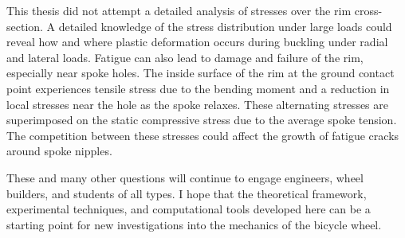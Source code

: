 \documentclass[\rootdir/thesis.tex]{subfiles}
\begin{document}
This thesis did not attempt a detailed analysis of stresses over the rim cross-section. A detailed knowledge of the stress distribution under large loads could reveal how and where plastic deformation occurs during buckling under radial and lateral loads. Fatigue can also lead to damage and failure of the rim, especially near spoke holes. The inside surface of the rim at the ground contact point experiences tensile stress due to the bending moment and a reduction in local stresses near the hole as the spoke relaxes. These alternating stresses are superimposed on the static compressive stress due to the average spoke tension. The competition between these stresses could affect the growth of fatigue cracks around spoke nipples.

These and many other questions will continue to engage engineers, wheel builders, and students of all types. I hope that the theoretical framework, experimental techniques, and computational tools developed here can be a starting point for new investigations into the mechanics of the bicycle wheel.
\end{document}
